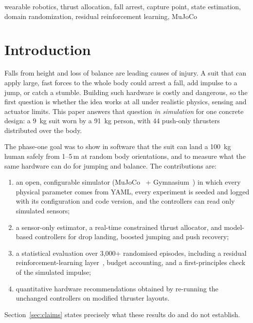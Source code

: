 \documentclass[conference]{IEEEtran}
\begin{document}
\begin{IEEEkeywords}
wearable robotics, thrust allocation, fall arrest, capture point, state estimation, domain randomization, residual reinforcement learning, MuJoCo
\end{IEEEkeywords}

\section{Introduction}
Falls from height and loss of balance are leading causes of injury. A suit that can apply large, fast forces to the whole body could arrest a fall, add impulse to a jump, or catch a stumble. Building such hardware is costly and dangerous, so the first question is whether the idea works at all under realistic physics, sensing and actuator limits. This paper answers that question \emph{in simulation} for one concrete design: a \SI{9}{kg} suit worn by a \SI{91}{kg} person, with 44 push-only thrusters distributed over the body.

The phase-one goal was to show in software that the suit can land a \SI{100}{kg} human safely from 1--5\,m at random body orientations, and to measure what the same hardware can do for jumping and balance. The contributions are:
\begin{enumerate}
\item an open, configurable simulator (MuJoCo~\cite{todorov2012mujoco} + Gymnasium~\cite{towers2024gymnasium}) in which every physical parameter comes from YAML, every experiment is seeded and logged with its configuration and code version, and the controllers can read only simulated sensors;
\item a sensor-only estimator, a real-time constrained thrust allocator, and model-based controllers for drop landing, boosted jumping and push recovery;
\item a statistical evaluation over 3{,}000+ randomised episodes, including a residual reinforcement-learning layer~\cite{silver2018residual,johannink2019residual}, budget accounting, and a first-principles check of the simulated impulse;
\item quantitative hardware recommendations obtained by re-running the unchanged controllers on modified thruster layouts.
\end{enumerate}
Section~\ref{sec:claims} states precisely what these results do and do not establish.

\end{document}
